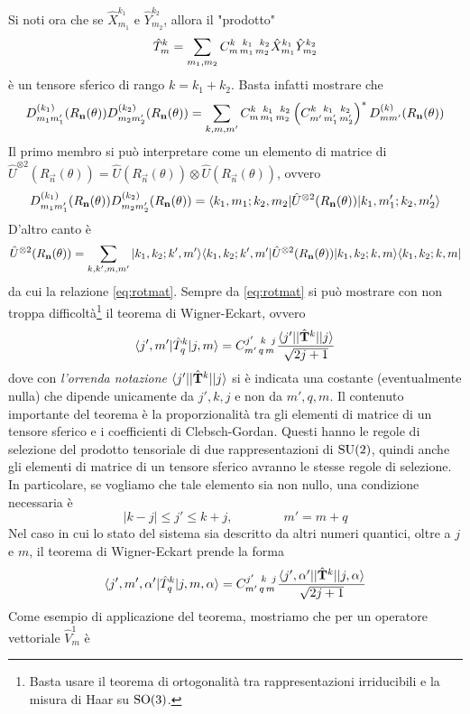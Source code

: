 \documentclass[a4paper, 11pt]{article}
\newcommand{\op}[1]{\hat{#1}}
\renewcommand{\op}[1]{\hat{#1}}
\renewcommand{\ket}[1]{| #1\rangle}
\renewcommand{\bra}[1]{\langle #1|}
\begin{document}
Si noti ora che se $\op X^{k_1}_{m_1}$ e $\op Y^{k_2}_{m_2}$, allora il "prodotto"
\[\op T^k_m=\sum_{m_1,m_2}\tensor*{C}{^{k\,\,\,\,k_1\,\,\,\,k_2}_{m\,m_1\,m_2}}\op X^{k_1}_{m_1}\op Y^{k_2}_{m_2}\]
è un tensore sferico di rango $k=k_1+k_2$. Basta infatti mostrare che 
\begin{equation}D^{(k_1)}_{m_1m_1'}(R_\vec{n}(\theta))D^{(k_2)}_{m_2m_2'}(R_\vec{n}(\theta))=\sum_{k,m,m'}\tensor*{C}{^{k\,\,\,\,k_1\,\,\,\,k_2}_{m\,m_1\,m_2}}\left(\tensor*{C}{^{k\,\,\,\,k_1\,\,\,\,k_2}_{m'\,m'_1\,m'_2}}\right)^*D^{(k)}_{mm'}(R_\vec{n}(\theta))\label{eq:rotmat}\end{equation}
Il primo membro si può interpretare come un elemento di matrice di $\op U^{\otimes2}(R_\vec{n}(\theta))=\op U(R_\vec{n}(\theta))\otimes\op U(R_\vec{n}(\theta))$, ovvero
\[D^{(k_1)}_{m_1m_1'}(R_\vec{n}(\theta))D^{(k_2)}_{m_2m_2'}(R_\vec{n}(\theta))=\braketop{k_1,m_1;k_2,m_2}{\op U^{\otimes2}(R_\vec{n}(\theta))}{k_1,m_1';k_2,m_2'}\]
D'altro canto è
\[\op U^{\otimes2}(R_\vec{n}(\theta))=\sum_{k,k',m,m'}\ket{k_1,k_2;k',m'}\braketop{k_1,k_2;k',m'}{\op U^{\otimes2}(R_\vec{n}(\theta))}{k_1,k_2;k,m}\bra {k_1,k_2;k,m}\]
da cui la relazione \ref{eq:rotmat}. Sempre da \ref{eq:rotmat} si può mostrare con non troppa difficoltà\footnote{Basta usare il teorema di ortogonalità tra rappresentazioni irriducibili e la misura di Haar su $\mathrm{SO}(3)$.} il teorema di Wigner-Eckart, ovvero
\[\braketop{j',m'}{\op T^k_q}{j,m}=\tensor*{C}{^{j'\,\,\,\,k\,\,\,j}_{m'\,q\,m}}\frac{\braketop{j'}{|\op{\vec{T}}^k|}{j}}{\sqrt{2j+1}}\]
dove con \emph{l'orrenda notazione} $\braketop{j'}{|\op{\vec{T}}^k|}{j}$ si è indicata una costante (eventualmente nulla) che dipende unicamente da $j',k,j$ e non da $m',q,m$. Il contenuto importante del teorema è la proporzionalità tra gli elementi di matrice di un tensore sferico e i coefficienti di Clebsch-Gordan. Questi hanno le regole di selezione del prodotto tensoriale di due rappresentazioni di $\mathrm{SU}(2)$, quindi anche gli elementi di matrice di un tensore sferico avranno le stesse regole di selezione. In particolare, se vogliamo che tale elemento sia non nullo, una condizione necessaria è
\[|k-j|\leq j'\leq k+j,\qquad\qquad m'=m+q\]
Nel caso in cui lo stato del sistema sia descritto da altri numeri quantici, oltre a $j$ e $m$, il teorema di Wigner-Eckart prende la forma
\[\braketop{j',m',\alpha'}{\op T^k_q}{j,m,\alpha}=\tensor*{C}{^{j'\,\,\,\,k\,\,\,j}_{m'\,q\,m}}\frac{\braketop{j',\alpha'}{|\op{\vec{T}}^k|}{j,\alpha}}{\sqrt{2j+1}}\]
Come esempio di applicazione del teorema, mostriamo che per un operatore vettoriale $\op V^1_m$ è
\end{document}

